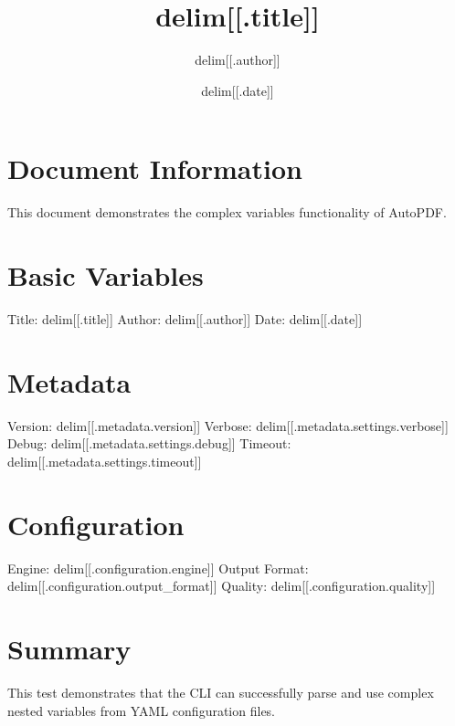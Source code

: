 \documentclass{article}
\title{delim[[.title]]}
\author{delim[[.author]]}
\date{delim[[.date]]}
\begin{document}
\maketitle

\section{Document Information}
This document demonstrates the complex variables functionality of AutoPDF.

\section{Basic Variables}
Title: delim[[.title]]
Author: delim[[.author]]
Date: delim[[.date]]

\section{Metadata}
Version: delim[[.metadata.version]]
Verbose: delim[[.metadata.settings.verbose]]
Debug: delim[[.metadata.settings.debug]]
Timeout: delim[[.metadata.settings.timeout]]

\section{Configuration}
Engine: delim[[.configuration.engine]]
Output Format: delim[[.configuration.output_format]]
Quality: delim[[.configuration.quality]]

\section{Summary}
This test demonstrates that the CLI can successfully parse and use complex nested variables from YAML configuration files.
\end{document}
